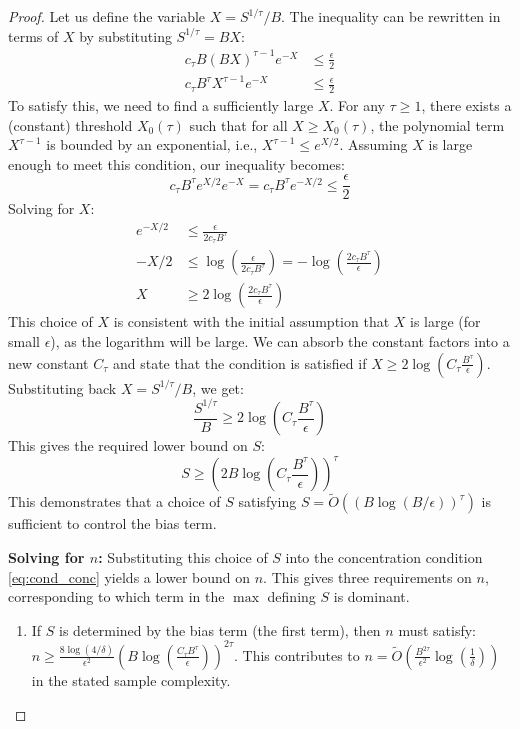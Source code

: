 \documentclass[10pt,a4paper]{amsart}
\begin{document}
\begin{proof}
Let us define the variable $X = S^{1/\tau}/B$. The inequality can be rewritten in terms of $X$ by substituting $S^{1/\tau} = BX$:
\begin{align*}
c_\tau B (BX)^{\tau-1} e^{-X} &\le \frac{\epsilon}{2} \\
c_\tau B^\tau X^{\tau-1} e^{-X} &\le \frac{\epsilon}{2}
\end{align*}
To satisfy this, we need to find a sufficiently large $X$. For any $\tau \ge 1$, there exists a (constant) threshold $X_0(\tau)$ such that for all $X \ge X_0(\tau)$, the polynomial term $X^{\tau-1}$ is bounded by an exponential, i.e., $X^{\tau-1} \le e^{X/2}$. Assuming $X$ is large enough to meet this condition, our inequality becomes:
\[
c_\tau B^\tau e^{X/2} e^{-X} = c_\tau B^\tau e^{-X/2} \le \frac{\epsilon}{2}
\]
Solving for $X$:
\begin{align*}
e^{-X/2} &\le \frac{\epsilon}{2 c_\tau B^\tau} \\
-X/2 &\le \log\left(\frac{\epsilon}{2 c_\tau B^\tau}\right) = -\log\left(\frac{2 c_\tau B^\tau}{\epsilon}\right) \\
X &\ge 2 \log\left(\frac{2 c_\tau B^\tau}{\epsilon}\right)
\end{align*}
This choice of $X$ is consistent with the initial assumption that $X$ is large (for small $\epsilon$), as the logarithm will be large. We can absorb the constant factors into a new constant $C_\tau$ and state that the condition is satisfied if
$
X \ge 2\log\left(C_\tau \frac{B^\tau}{\epsilon}\right).
$
Substituting back $X = S^{1/\tau}/B$, we get:
\[
\frac{S^{1/\tau}}{B} \ge 2\log\left(C_\tau \frac{B^\tau}{\epsilon}\right)
\]
This gives the required lower bound on $S$:
\[
S \ge \left(2B \log\left(C_\tau \frac{B^\tau}{\epsilon}\right)\right)^\tau
\]
This demonstrates that a choice of $S$ satisfying $S = \tilde{O}((B \log(B/\epsilon))^\tau)$ is sufficient to control the bias term.

\textbf{Solving for $n$:} Substituting this choice of $S$ into the concentration condition \eqref{eq:cond_conc} yields a lower bound on $n$. This gives three requirements on $n$, corresponding to which term in the $\max$ defining $S$ is dominant.
\begin{enumerate}
    \item If $S$ is determined by the bias term (the first term), then $n$ must satisfy:
    $n \ge \frac{8 \log(4/\delta)}{\epsilon^2} \left(B \log\left(\frac{C_\tau B^\tau}{\epsilon}\right)\right)^{2\tau}.$
    This contributes to $n = \tilde{O}\left(\frac{B^{2\tau}}{\epsilon^2} \log\left(\frac 1 \delta \right)\right)$ in the stated sample complexity.
    

\end{enumerate}
\end{proof}
\end{document}
